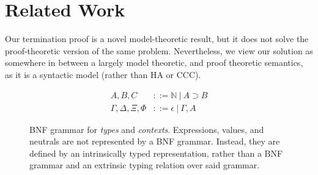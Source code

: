 \documentclass{llncs}
\def\dfn{\mapsto}
\def\arr{\supset}
\def\marr{\rightarrow}
\def\nat{\mathbb{N}}
\def\emp{\epsilon}
\newcommand{\turn}[1]{\vdash^\con{#1}}
\newcommand{\el}[1]{\llbracket ~ #1 ~ \rrbracket}
\newcommand{\con}[1]{\textmd{#1}}
\newcommand{\fun}[1]{\textmd{#1}}
\newcommand{\typm}[1]{\el{\Gamma \vdash #1}}
\newcommand{\dtypm}[1]{\el{\Delta \vdash #1}}
\newcommand{\typv}[1]{\Gamma \turn{V} #1}
\newcommand{\dtypv}[1]{\Delta \turn{V} #1}
\newcommand{\denv}[1]{\fun{Env}~#1~\Delta}
\begin{document}




\section{Related Work}

Our termination proof is a novel model-theoretic result, but it
does not solve the proof-theoretic version of the same problem.
Nevertheless, we view our solution as somewhere in between a largely
model theoretic, and proof theoretic semantics, as it is a syntactic
model (rather than HA or CCC).









\appendix
\clearpage

\begin{figure}
\caption{
BNF grammar for \textit{types} and \textit{contexts}. 
Expressions, values, and neutrals
are not represented by a BNF grammar. Instead, they are defined by
an intrinsically typed representation, rather than a BNF grammar and
an extrinsic typing relation over said grammar.
}
\begin{align*}
A, B, C &::= \nat ~ | ~ A \arr B \\
\Gamma, \Delta, \Xi, \Phi &::= \emp ~ | ~ \Gamma , A
\end{align*}
\label{fig:gram}
\end{figure}
\end{document}
